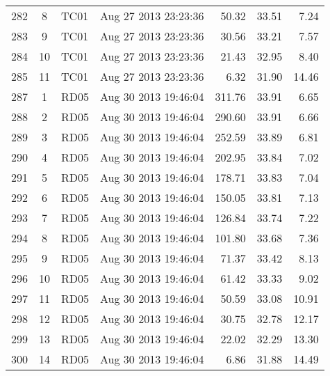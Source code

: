 \documentclass{article}
\begin{document}
\begin{longtable}{ccllrrr}
282&8&TC01&Aug 27 2013 23:23:36&50.32&33.51&7.24\\
283&9&TC01&Aug 27 2013 23:23:36&30.56&33.21&7.57\\
284&10&TC01&Aug 27 2013 23:23:36&21.43&32.95&8.40\\
285&11&TC01&Aug 27 2013 23:23:36&6.32&31.90&14.46\\
\hline 
287&1&RD05&Aug 30 2013 19:46:04&311.76&33.91&6.65\\
288&2&RD05&Aug 30 2013 19:46:04&290.60&33.91&6.66\\
289&3&RD05&Aug 30 2013 19:46:04&252.59&33.89&6.81\\
290&4&RD05&Aug 30 2013 19:46:04&202.95&33.84&7.02\\
291&5&RD05&Aug 30 2013 19:46:04&178.71&33.83&7.04\\
292&6&RD05&Aug 30 2013 19:46:04&150.05&33.81&7.13\\
293&7&RD05&Aug 30 2013 19:46:04&126.84&33.74&7.22\\
294&8&RD05&Aug 30 2013 19:46:04&101.80&33.68&7.36\\
295&9&RD05&Aug 30 2013 19:46:04&71.37&33.42&8.13\\
296&10&RD05&Aug 30 2013 19:46:04&61.42&33.33&9.02\\
297&11&RD05&Aug 30 2013 19:46:04&50.59&33.08&10.91\\
298&12&RD05&Aug 30 2013 19:46:04&30.75&32.78&12.17\\
299&13&RD05&Aug 30 2013 19:46:04&22.02&32.29&13.30\\
300&14&RD05&Aug 30 2013 19:46:04&6.86&31.88&14.49\\
\hline 

 \end{longtable} 
 
\end{document}
